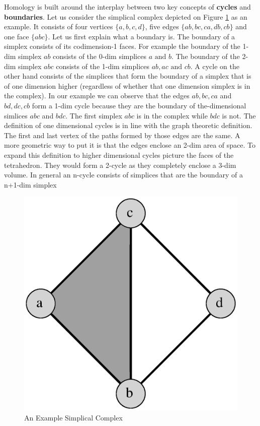 Homology is built around the interplay between two key concepts of \textbf{cycles} and \textbf{boundaries}. Let us consider the simplical complex depicted on Figure \ref{fig:hom-sc} as an example. It consists of four vertices $\{a, b, c, d\}$, five edges $\{ab, bc, ca, db, cb\}$ and one face $\{abc\}$. Let us first explain what a boundary is. The boundary of a simplex consists of its codimension-1 faces. For example the boundary of the 1-dim simplex $ab$ consists of the 0-dim simplices $a \text{ and } b$. The boundary of the 2-dim simplex $abc$ consists of the 1-dim simplices $ab, ac \text{ and } cb$. A cycle on the other hand consists of the simplices that form the boundary of a simplex that is of one dimension higher (regardless of whether that one dimension simplex is in the complex). In our example we can observe that the edges $ab, bc, ca$ and $bd, dc, cb$ form a 1-dim cycle because they are the boundary of the-dimensional simlices $abc$ and $bdc$. The first simplex $abc$ is in the complex while $bdc$ is not. The definition of one dimensional cycles is in line with the graph theoretic definition. The first and last vertex of the paths formed by those edges are the same. A more geometric way to put it is that the edges enclose an 2-dim area of space. To expand this definition to higher dimensional cycles picture the faces of the tetrahedron. They would form a 2-cycle as they completely enclose a 3-dim volume. In general an n-cycle consists of simplices that are the boundary of a n+1-dim simplex

\begin{figure}[h]%
    \centering
    \includegraphics[scale=0.4]{./images/chapter1/homology-sc.eps}%
    \caption{An Example Simplical Complex}%
    \label{fig:hom-sc}%
\end{figure}

